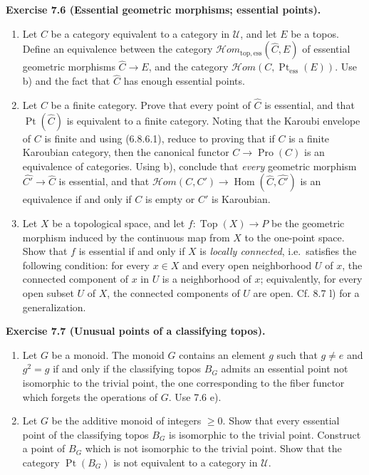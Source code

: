 \documentclass[11pt]{article}
\newcommand{\U}{\mathcal{U}}
\newcommand{\Top}{\operatorname{Top}}
\newcommand{\Hom}{\operatorname{Hom}}
\newcommand{\Pro}{\operatorname{Pro}}
\newcommand{\Ppoint}{\operatorname{Pt}}
\newcommand{\Ppointess}{\operatorname{Pt}_{\mathrm{ess}}}
\newcommand{\Hhom}{\mathcal{H}om}
\newcommand{\Hhomtopess}{\mathcal{H}om_{\mathrm{top},\mathrm{ess}}}
\newcommand{\ie}{i.e.}
\newenvironment{remarktext}[1]{\par\medskip\noindent\textbf{#1.}\ }{\par\medskip}
\begin{document}
\begin{remarktext}{Exercise 7.6 (Essential geometric morphisms; essential points)}
\begin{enumerate}[label=\alph*)]
\item Let \(C\) be a category equivalent to a category in \(\U\), and let \(E\) be a topos. Define an equivalence between the category \(\Hhomtopess(\widehat C,E)\) of essential geometric morphisms \(\widehat C\to E\), and the category \(\Hhom(C,\Ppointess(E))\). Use b) and the fact that \(\widehat C\) has enough essential points.

\item Let \(C\) be a finite category. Prove that every point of \(\widehat C\) is essential, and that \(\Ppoint(\widehat C)\) is equivalent to a finite category. Noting that the Karoubi envelope of \(C\) is finite and using (6.8.6.1), reduce to proving that if \(C\) is a finite Karoubian category, then the canonical functor \(C\to\Pro(C)\) is an equivalence of categories. Using b), conclude that \emph{every} geometric morphism \(\widehat{C'}\to\widehat C\) is essential, and that \(\Hhom(C,C')\to\Hom(\widehat C,\widehat{C'})\) is an equivalence if and only if \(C\) is empty or \(C'\) is Karoubian.

\item Let \(X\) be a topological space, and let \(f:\Top(X)\to P\) be the geometric morphism induced by the continuous map from \(X\) to the one-point space. Show that \(f\) is essential if and only if \(X\) is \emph{locally connected}, \ie\ satisfies the following condition: for every \(x\in X\) and every open neighborhood \(U\) of \(x\), the connected component of \(x\) in \(U\) is a neighborhood of \(x\); equivalently, for every open subset \(U\) of \(X\), the connected components of \(U\) are open. Cf. 8.7 l) for a generalization.
\end{enumerate}
\end{remarktext}

\begin{remarktext}{Exercise 7.7 (Unusual points of a classifying topos)}
\begin{enumerate}[label=\alph*)]
\item Let \(G\) be a monoid. The monoid \(G\) contains an element \(g\) such that \(g\ne e\) and \(g^2=g\) if and only if the classifying topos \(B_G\) admits an essential point not isomorphic to the trivial point, the one corresponding to the fiber functor which forgets the operations of \(G\). Use 7.6 e).
\item Let \(G\) be the additive monoid of integers \(\ge0\). Show that every essential point of the classifying topos \(B_G\) is isomorphic to the trivial point. Construct a point of \(B_G\) which is not isomorphic to the trivial point. Show that the category \(\Ppoint(B_G)\) is not equivalent to a category in \(\U\).
\end{enumerate}
\end{remarktext}
\end{document}
